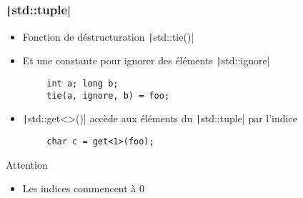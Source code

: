 \documentclass[C++.tex]{subfiles}
\begin{document}
\begin{frame}[fragile]
	\frametitle{\texttt|std::tuple|}
	\begin{itemize}
		\item Fonction de déstructuration \texttt|std::tie()|
		\item Et une constante pour ignorer des éléments \texttt|std::ignore|
	\end{itemize}

	\begin{verbatim}
		int a; long b;
		tie(a, ignore, b) = foo;
	\end{verbatim}


	\begin{itemize}
		\item \texttt|std::get<>()| accède aux éléments du \texttt|std::tuple| par l'indice
	\end{itemize}

	\begin{verbatim}
		char c = get<1>(foo);
	\end{verbatim}

	\begin{alertblock}{Attention}
		\begin{itemize}
			\item Les indices commencent à 0
		\end{itemize}
	\end{alertblock}
\end{frame}
\end{document}
